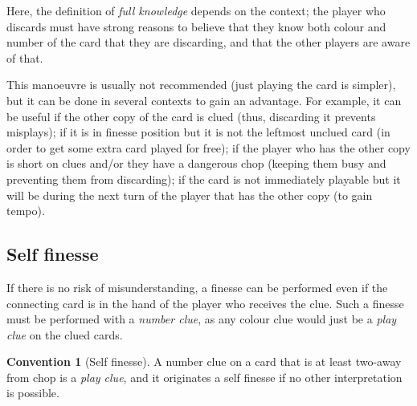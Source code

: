 \documentclass[a4paper]{article}
\theoremstyle{plain}
\theoremstyle{definition}
\newtheorem{convention}[theorem]{Convention}
\begin{document}
Here, the definition of \emph{full knowledge} depends on the context; the player who discards must have strong reasons to believe that they know both colour and number of the card that they are discarding, and that the other players are aware of that.

This manoeuvre is usually not recommended (just playing the card is simpler), but it can be done in several contexts to gain an advantage. For example, it can be useful if the other copy of the card is clued (thus, discarding it prevents misplays); if it is in finesse position but it is not the leftmost unclued card (in order to get some extra card played for free); if the player who has the other copy is short on clues and/or they have a dangerous chop (keeping them busy and preventing them from discarding); if the card is not immediately playable but it will be during the next turn of the player that has the other copy (to gain tempo).

\subsection{Self finesse}

If there is no risk of misunderstanding, a finesse can be performed even if the connecting card is in the hand of the player who receives the clue. Such a finesse must be performed with a \emph{number clue}, as any colour clue would just be a \emph{play clue} on the clued cards.

\begin{convention}[Self finesse]
	A number clue on a card that is at least two-away from chop is a \emph{play clue}, and it originates a self finesse if no other interpretation is possible.
\end{convention}
\end{document}
